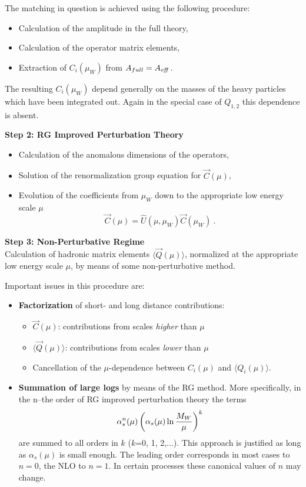 \documentclass[12pt]{article}
\def\as{\alpha_s}
\begin{document}
\begin{itemize}
\begin{itemize}
\begin{itemize}
The matching in question is achieved using the following procedure:

\begin{itemize}
\item
Calculation of the amplitude in the full theory,
\item
Calculation of the operator matrix elements,
\item
Extraction of $C_i(\mu_W)$ from $A_{full}=A_{\it eff}$.
\end{itemize}
The resulting $C_i(\mu_W)$ depend generally on the masses of the
heavy particles which have been integrated out. Again in the
special case of $Q_{1,2}$ this dependence is absent.

\noindent
{\bf Step 2: RG Improved Perturbation Theory}
\begin{itemize}
\item Calculation of the anomalous dimensions of the operators,
\item Solution of the renormalization group equation for $\vec{C}(\mu)$,
\item Evolution of the coefficients from $\mu_W$ down to the
appropriate low energy scale $\mu$
\begin{displaymath}
\vec C(\mu)=\hat U(\mu, \mu_W)\vec C(\mu_W)~.
\end{displaymath}
\end{itemize}

\medskip
\noindent
{\bf Step 3: Non-Perturbative Regime}
\\
Calculation of hadronic matrix elements $\langle\vec Q(\mu)\rangle$,
normalized at the appropriate low energy scale $\mu$, by means of
some non-perturbative method.

\bigskip
\noindent
Important issues in this procedure are:
\begin{itemize}
\item {\bf Factorization\/} of short- and long
distance contributions:
\begin{itemize}
\item
 $\vec C(\mu)$: contributions from scales {\it higher} than $\mu$
\item 
$\langle \vec Q(\mu)\rangle$: contributions from scales {\it lower}
than $\mu$
\item 
Cancellation of  the $\mu$-dependence
between $C_i(\mu)$ and
$\langle Q_i(\mu)\rangle$.
\end{itemize}
\item  {\bf Summation of large logs\/} by means of the RG method.
 More specifically, in the n--the  order of
RG improved perturbation theory the terms 
\begin{displaymath}
\as^n(\mu)
\left(\as(\mu)\ln{M_W\over\mu}\right)^k
\end{displaymath}
are summed to all orders in $k$ ($k$=0, 1, 2,$\ldots$). This approach
is justified as long as $\as(\mu)$ is small enough. The leading order
corresponds in most cases to $n=0$, the NLO to $n=1$. In certain
processes these canonical values of $n$ may change.
\end{itemize}


\end{itemize}
\end{itemize}
\end{itemize}
\end{document}

